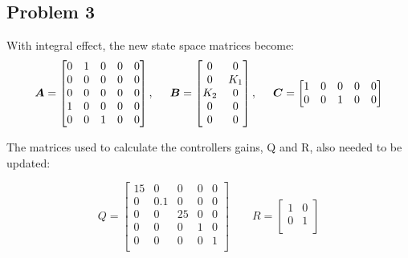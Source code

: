 \subsection{Problem 3}
With integral effect, the new state space matrices become:
\begin{equation}
  \boldsymbol{A} = \begin{bmatrix}
    0 & 1 & 0 & 0 & 0\\
    0 & 0 & 0 & 0 & 0\\
    0 & 0 & 0 & 0 & 0\\
		1 & 0 & 0 & 0 & 0\\
		0 & 0 & 1 & 0 & 0\\
  \end{bmatrix}, \hspace{0.5cm}
  \boldsymbol{B} = \begin{bmatrix}
    0 & 0 \\
    0 & K_1 \\
    K_2 & 0 \\
		0 & 0 \\
		0 & 0 \\
  \end{bmatrix}, \hspace{0.5cm}
	\boldsymbol{C} = \begin{bmatrix}
    1 & 0 & 0 & 0 & 0\\
		0 & 0 & 1 & 0 & 0\\
  \end{bmatrix}
\end{equation}

The matrices used to calculate the controllers gains, Q and R, also needed to be updated:

\begin{equation}
Q = 
	\begin{bmatrix}
    15 & 0   & 0  & 0 & 0 \\
    0  & 0.1 & 0  & 0 & 0 \\
    0  & 0   & 25 & 0 & 0 \\
		0  & 0   & 0  & 1 & 0 \\
		0  & 0   & 0  & 0 & 1 \\
  \end{bmatrix}
	\qquad
R =
	\begin{bmatrix}
    1 & 0 \\
    0 & 1 \\
  \end{bmatrix}
\end{equation}


